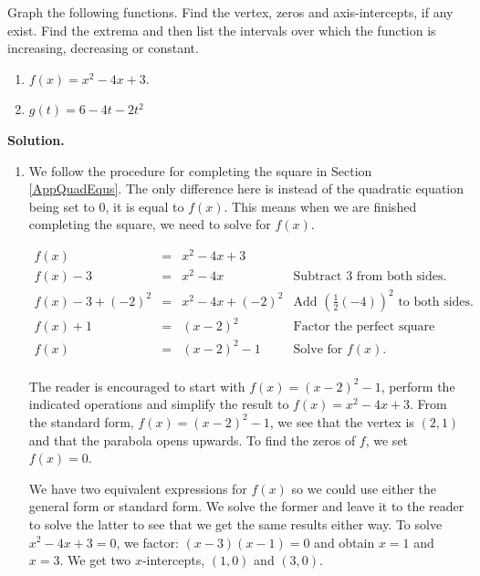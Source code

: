 \documentclass{ximera}
\begin{document}
\begin{ex}  \label{parabolaex2} Graph the following functions.  Find the vertex, zeros and axis-intercepts, if any exist. Find the extrema and then list the intervals over which the function is increasing, decreasing or constant.

\begin{multicols}{2}
\begin{enumerate}

\item  $f(x) = x^2-4x+3$.
\item  $g(t) = 6 - 4t -2t^2$

\end{enumerate}
\end{multicols}


{\bf Solution.} 

\begin{enumerate}

\item   We follow the procedure for completing the square in Section \ref{AppQuadEqus}.  The only difference here is instead of the quadratic equation being set to $0$, it is equal to $f(x)$.  This means when we are finished completing the square, we need to solve for $f(x)$.

\[ \begin{array}{rclr}

f(x) & = & x^2 - 4x+3 & \\ [4pt]
f(x) - 3 & = & x^2-4x & \text{Subtract $3$ from both sides.} \\ [4pt]
f(x) - 3 + (-2)^2 & = & x^2-4x+(-2)^2 & \text{Add $\left(\frac{1}{2}(-4)\right)^2$ to both sides.} \\ [4pt]

f(x) + 1 & = &  (x-2)^2 & \text{Factor the perfect square trinomial.} \\ [4pt]

f(x) & = & (x-2)^2 - 1 & \text{Solve for $f(x)$.} \\ \end{array}\]

The reader is encouraged to start with $f(x) = (x-2)^2-1$, perform the indicated operations and simplify the result to $f(x) = x^2-4x+3$.  From the standard form, $f(x) = (x-2)^2-1$, we see that the vertex is $(2,1)$ and that the parabola opens upwards.  To find the zeros of $f$, we set $f(x) = 0$.

\medskip

We have two equivalent expressions for $f(x)$ so we could use either the general form or standard form.  We solve the former and leave it to the reader to solve the latter to see that we get the same results either way.  To solve $x^2 - 4x + 3 = 0$, we factor: $(x-3)(x-1) = 0$ and obtain $x = 1$ and $x =3$.  We get two $x$-intercepts, $(1,0)$ and $(3,0)$. 


\end{enumerate}
\end{ex}
\end{document}
